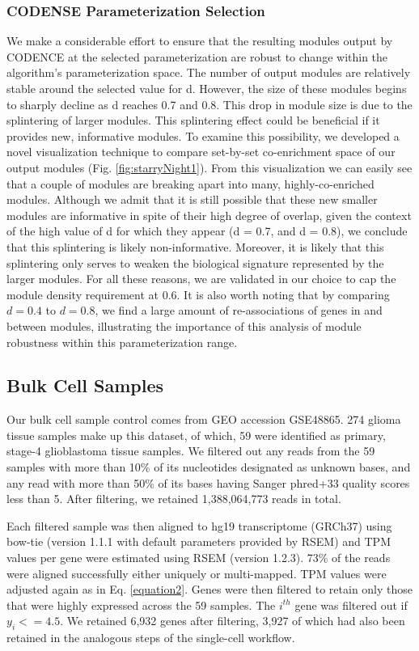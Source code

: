 \documentclass[10pt,letterpaper]{article}
\begin{document}
\subsubsection*{CODENSE Parameterization Selection}
We make a considerable effort to ensure that the resulting modules output by CODENCE at the selected parameterization are robust to change within the algorithm's parameterization space. The number of output modules are relatively stable around the selected value for d. However, the size of these modules begins to sharply decline as d reaches 0.7 and 0.8. This drop in module size is due to the splintering of larger modules. This splintering effect could be beneficial if it provides new, informative modules. To examine this possibility, we developed a novel visualization technique to compare set-by-set co-enrichment space of our output modules (Fig. \ref{fig:starryNight1}).
From this visualization we can easily see that a couple of modules are breaking apart into many, highly-co-enriched modules. Although we admit that it is still possible that these new smaller modules are informative in spite of their high degree of overlap, given the context of the high value of d for which they appear (d = 0.7, and d = 0.8), we conclude that this splintering is likely non-informative. Moreover, it is likely that this splintering only serves to weaken the biological signature represented by the larger modules. For all these reasons, we are validated in our choice to cap the module density requirement at 0.6.
It is also worth noting that by comparing $d = 0.4$ to $d = 0.8$, we find a large amount of re-associations of genes in and between modules, illustrating the importance of this analysis of module robustness within this parameterization range.  

\subsection{Bulk Cell Samples}
Our bulk cell sample control comes from GEO accession GSE48865. 274 glioma tissue samples make up this dataset, of which, 59 were identified as primary, stage-4 glioblastoma tissue samples. We filtered out any reads from the 59 samples with more than 10\% of its nucleotides designated as unknown bases, and any read with more than 50\% of its bases having Sanger phred+33 quality scores less than 5. After filtering, we retained 1,388,064,773 reads in total. 

Each filtered sample was then aligned to hg19 transcriptome (GRCh37) using bow-tie (version 1.1.1 with default parameters provided by RSEM) and TPM values per gene were estimated using RSEM (version 1.2.3). 73\% of the reads were aligned successfully either uniquely or multi-mapped. 
TPM values were adjusted again as in Eq. \ref{equation2}. Genes were then filtered to retain only those that were highly expressed across the 59 samples. The $i^{th}$ gene was filtered out if $y_{i} <= 4.5$. We retained 6,932 genes after filtering, 3,927 of which had also been retained in the analogous steps of the single-cell workflow.
\end{document}
